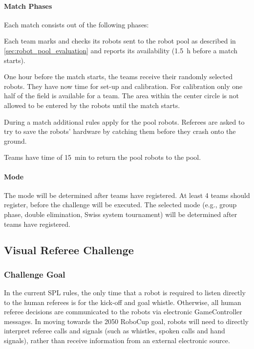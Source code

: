         \paragraph{Match Phases}
            Each match consists out of the following phases:
            \begin{description}[leftmargin=0.5cm,labelindent=0.5cm]
                \item[Robot check] Each team marks and checks its robots sent to the robot pool as described in \cref{sec:robot_pool_evaluation} and reports its availability (\qty{1.5}{\hour} before a match starts).
                \item[Setup] One hour before the match starts, the teams receive their randomly selected robots. They have now time for set-up and calibration. For calibration only one half of the field is available for a team. The area within the center circle is not allowed to be entered by the robots until the match starts.

                \item[Game] During a match additional rules apply for the pool robots. Referees are asked to try to save the robots' hardware by catching them before they crash onto the ground.
                \item[After game] Teams have time of \qty{15}{\minute} to return the pool robots to the pool.
            \end{description}

        \paragraph{Mode}
            The mode will be determined after teams have registered. At least 4 teams should register, before the challenge will be executed. The selected mode (e.g., group phase, double elimination, Swiss system tournament) will be determined after teams have registered.

\newpage

\subsection{Visual Referee Challenge}

    \subsubsection{Challenge Goal}

        In the current SPL rules, the only time that a robot is required to listen directly to the human referees is for the kick-off and goal whistle. Otherwise, all human referee decisions are communicated to the robots via electronic GameController messages. In moving towards the 2050 RoboCup goal, robots will need to directly interpret referee calls and signals (such as whistles, spoken calls and hand signals), rather than receive information from an external electronic source.
        
